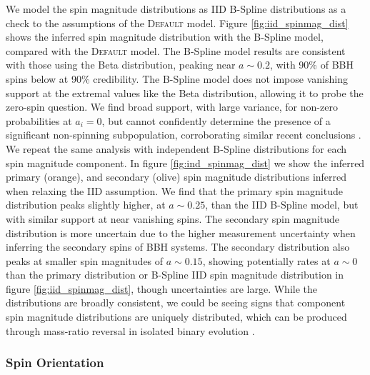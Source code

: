 We model the spin magnitude distributions as IID B-Spline distributions as a check to the assumptions of the \textsc{Default} model. 
Figure \ref{fig:iid_spinmag_dist} shows the inferred spin magnitude distribution with the B-Spline model, compared with the \textsc{Default} model. 
The B-Spline model results are consistent with those using the Beta distribution, peaking near $a\sim0.2$, with 90\% of BBH spins below 
\result{$\CIPlusMinus{\macros[BSplineIIDCompSpins][a_90percentile]}$} at 90\% credibility. The B-Spline model does not impose vanishing support at the extremal values like the Beta distribution, 
allowing it to probe the zero-spin question. We find broad support, with large variance, for non-zero probabilities at $a_i=0$, but cannot confidently determine the presence of 
a significant non-spinning subpopulation, corroborating similar recent conclusions \citep{BuildBetterSpinModels,Callister_NoEvidence,GWTC3MonashSpin,Mould2022}. 
We repeat the same analysis with independent B-Spline distributions for each spin magnitude component. In figure \ref{fig:ind_spinmag_dist} 
we show the inferred primary (orange), and secondary (olive) spin magnitude distributions inferred when relaxing the IID assumption. We find that the primary spin magnitude distribution 
peaks slightly higher, at $a\sim0.25$, than the IID B-Spline model, but with similar support at near vanishing spins. The secondary spin magnitude distribution is more uncertain due to the 
higher measurement uncertainty when inferring the secondary spins of BBH systems. The secondary distribution also peaks at smaller spin magnitudes of $a\sim0.15$, showing potentially rates at $a\sim0$ than the primary distribution or B-Spline IID spin magnitude distribution in figure \ref{fig:iid_spinmag_dist}, though uncertainties are large. While the distributions are broadly consistent, we could be seeing signs that component spin magnitude distributions are uniquely distributed, which can be produced through mass-ratio reversal in isolated binary evolution \citep{Mould2022}.

\subsubsection{Spin Orientation}

